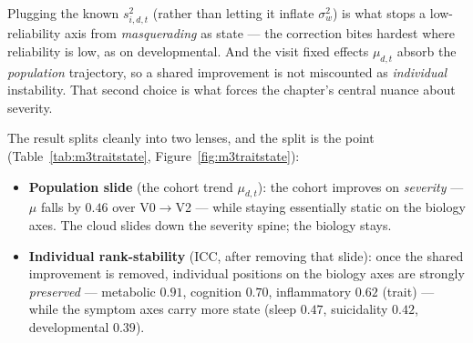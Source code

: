\begin{methodsbox}
Plugging the known $s^2_{i,d,t}$ (rather than letting it inflate $\sigma^2_w$) is what stops a low-reliability
axis from \emph{masquerading} as state --- the correction bites hardest where reliability is low, as on
developmental. And the visit fixed effects $\mu_{d,t}$ absorb the \emph{population} trajectory, so a shared
improvement is not miscounted as \emph{individual} instability. That second choice is what forces the chapter's
central nuance about severity.
\end{methodsbox}

The result splits cleanly into two lenses, and the split is the point (Table~\ref{tab:m3traitstate},
Figure~\ref{fig:m3traitstate}):

\begin{itemize}
\item \textbf{Population slide} (the cohort trend $\mu_{d,t}$): the cohort improves on \emph{severity} ---
$\mu$ falls by $0.46$ over V0$\to$V2 --- while staying essentially static on the biology axes. The cloud slides
down the severity spine; the biology stays.
\item \textbf{Individual rank-stability} (ICC, after removing that slide): once the shared improvement is
removed, individual positions on the biology axes are strongly \emph{preserved} --- metabolic $0.91$, cognition
$0.70$, inflammatory $0.62$ (trait) --- while the symptom axes carry more state (sleep $0.47$, suicidality
$0.42$, developmental $0.39$).
\end{itemize}

